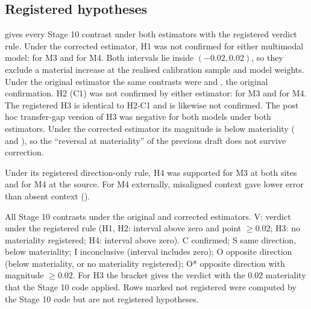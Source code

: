 \subsection{Registered hypotheses}
\label{sec:res-hyp}
 gives every Stage 10 contrast under both estimators with the
registered verdict rule. Under the corrected estimator, H1 was not confirmed
for either multimodal model: \HOneMThreeEval{} for M3 and \HOneMFourEval{} for
M4. Both intervals lie inside $(-0.02,0.02)$, so they exclude a material
increase at the realised calibration sample and model weights. Under the
original estimator the same contrasts were \HOneMThreeOrig{} and
\HOneMFourOrig{}, the original confirmation. H2 (C1) was not confirmed by
either estimator: \HTwoMThreeCOneEval{} for M3 and \HTwoMFourCOneEval{} for M4.
The registered H3 is identical to H2-C1 and is likewise not confirmed. The post
hoc transfer-gap version of H3 was negative for both models under both
estimators. Under the corrected estimator its magnitude is below materiality
(\HThreeMThreeEval{} and \HThreeMFourEval{}), so the ``reversal at
materiality'' of the previous draft does not survive correction.

Under its registered direction-only rule, H4 was supported for M3 at both sites
and for M4 at the source. For M4 externally, misaligned context gave lower
error than absent context (\HFourMFourexternalEval{}).

\begin{table}[t]
\centering\footnotesize
\begin{adjustbox}{max width=\linewidth}

\end{adjustbox}
\caption{All Stage 10 contrasts under the original and corrected estimators.
V: verdict under the registered rule (H1, H2: interval above zero and point
$\ge0.02$; H3: no materiality registered; H4: interval above zero). C
confirmed; S same direction, below materiality; I inconclusive (interval
includes zero); O opposite direction (below materiality, or no materiality
registered); O* opposite direction with magnitude $\ge0.02$. For H3 the bracket gives the verdict with the 0.02
materiality that the Stage 10 code applied. Rows marked not registered were
computed by the Stage 10 code but are not registered hypotheses.}
\label{tab:hyp}
\end{table}

